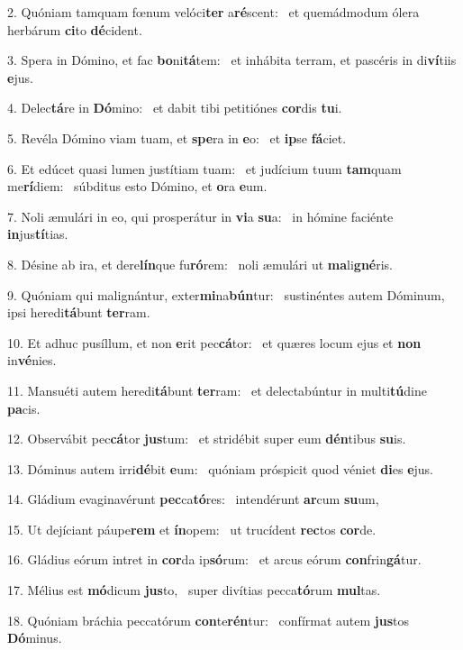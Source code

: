2. Quóniam tamquam fœnum velóci\textbf{ter} a\textbf{ré}scent: \ast\  et quemádmodum ólera herbárum \textbf{ci}to \textbf{dé}cident.\

3. Spera in Dómino, et fac \textbf{bo}ni\textbf{tá}tem: \ast\  et inhábita terram, et pascéris in di\textbf{ví}tiis \textbf{e}jus.\

4. Delec\textbf{tá}re in \textbf{Dó}mino: \ast\  et dabit tibi petitiónes \textbf{cor}dis \textbf{tu}i.\

5. Revéla Dómino viam tuam, et \textbf{spe}ra in \textbf{e}o: \ast\  et \textbf{ip}se \textbf{fá}ciet.\

6. Et edúcet quasi lumen justítiam tuam: \dag\  et judícium tuum \textbf{tam}quam me\textbf{rí}diem: \ast\  súbditus esto Dómino, et \textbf{o}ra \textbf{e}um.\

7. Noli æmulári in eo, qui prosperátur in \textbf{vi}a \textbf{su}a: \ast\  in hómine faciénte \textbf{in}jus\textbf{tí}tias.\

8. Désine ab ira, et dere\textbf{lín}que fu\textbf{ró}rem: \ast\  noli æmulári ut \textbf{ma}li\textbf{gné}ris.\

9. Quóniam qui malignántur, exter\textbf{mi}na\textbf{bún}tur: \ast\  sustinéntes autem Dóminum, ipsi heredi\textbf{tá}bunt \textbf{ter}ram.\

10. Et adhuc pusíllum, et non \textbf{e}rit pec\textbf{cá}tor: \ast\  et quæres locum ejus et \textbf{non} in\textbf{vé}nies.\

11. Mansuéti autem heredi\textbf{tá}bunt \textbf{ter}ram: \ast\  et delectabúntur in multi\textbf{tú}dine \textbf{pa}cis.\

12. Observábit pec\textbf{cá}tor \textbf{jus}tum: \ast\  et stridébit super eum \textbf{dén}tibus \textbf{su}is.\

13. Dóminus autem irri\textbf{dé}bit \textbf{e}um: \ast\  quóniam próspicit quod véniet \textbf{di}es \textbf{e}jus.\

14. Gládium evaginavérunt \textbf{pec}ca\textbf{tó}res: \ast\  intendérunt \textbf{ar}cum \textbf{su}um,\

15. Ut dejíciant páupe\textbf{rem} et \textbf{ín}opem: \ast\  ut trucídent \textbf{rec}tos \textbf{cor}de.\

16. Gládius eórum intret in \textbf{cor}da ip\textbf{só}rum: \ast\  et arcus eórum \textbf{con}frin\textbf{gá}tur.\

17. Mélius est \textbf{mó}dicum \textbf{jus}to, \ast\  super divítias pecca\textbf{tó}rum \textbf{mul}tas.\

18. Quóniam bráchia peccatórum \textbf{con}te\textbf{rén}tur: \ast\  confírmat autem \textbf{jus}tos \textbf{Dó}minus.\

